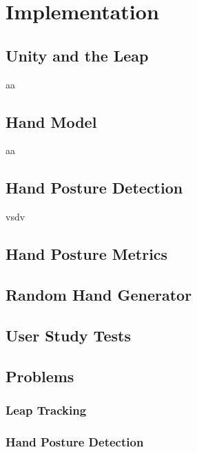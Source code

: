 \chapter{Implementation}\label{chapter:implementation}

\section{Unity and the Leap}
aa

\section{Hand Model}
aa
\section{Hand Posture Detection}
vsdv
\section{Hand Posture Metrics}

\section{Random Hand Generator}

\section{User Study Tests}

\section{Problems}

\subsection{Leap Tracking}

\subsection{Hand Posture Detection}